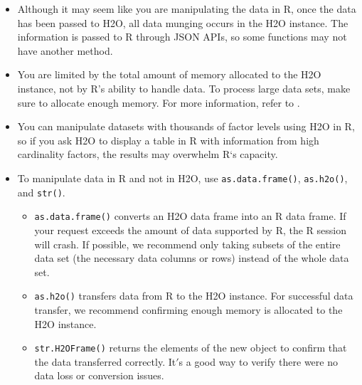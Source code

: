 {{\begin{itemize}
\item Although it may seem like you are manipulating the data in R, once the data has been passed to H2O, all data munging occurs in the H2O instance. The information is passed to R through JSON APIs, so some functions may not have another method. 
\item You are limited by the total amount of memory allocated to the H2O instance, not by R's ability to handle data. To process large data sets, make sure to allocate enough memory. For more information, refer to . 
\item You can manipulate datasets with thousands of factor levels using H2O in R, so if you ask H2O to display a table in R with information from high cardinality factors, the results may overwhelm R`s capacity. 
\item To manipulate data in R and not in H2O, use {\texttt{as.data.frame()}}, {\texttt{as.h2o()}}, and {\texttt{str()}}. \begin{itemize}
\item {\texttt{as.data.frame()}} converts an H2O data frame into an R data frame. If your request exceeds the amount of data supported by R, the R session will crash. If possible, we recommend only taking subsets of the entire data set (the necessary data columns or rows) instead of the whole data set. 
\item {\texttt{as.h2o()}} transfers data from R to the H2O instance. For successful data transfer, we recommend confirming enough memory is allocated to the H2O instance.
\item {\texttt{str.H2OFrame()}} returns the elements of the new object to confirm that the data transferred correctly. It$'$s a good way to verify there were no data loss or conversion issues. %
\end{itemize}
\end{itemize}



}}
